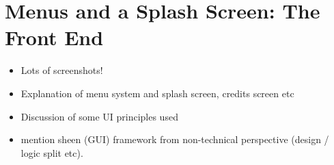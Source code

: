 \section{Menus and a Splash Screen: The Front End}

\begin{itemize}
    \item Lots of screenshots!
    \item Explanation of menu system and splash screen, credits screen etc
    \item Discussion of some UI principles used
    \item mention sheen (GUI) framework from non-technical perspective (design / logic split etc).
\end{itemize}